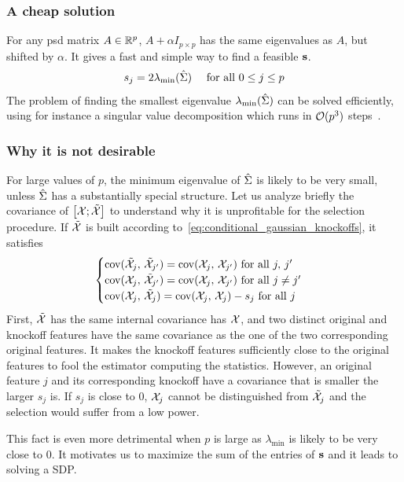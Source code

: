 \subsubsection{A cheap solution}

For any psd matrix $A \in \mathbb{R}^p$, $A + \alpha I_{p \times p}$ has the same eigenvalues as $A$, but shifted by $\alpha$.
It gives a fast and simple way to find a feasible $\mathbf{s}$.
\begin{equation}\label{eq:equi}
    s_j = 2\lambda_{\min}(\hat{\Sigma})
    \quad\text{ for all } 0 \leq j \leq p
\end{equation}
The problem of finding the smallest eigenvalue $\lambda_{\min}(\hat{\Sigma})$ can be solved efficiently,
using for instance a singular value decomposition which runs in $\mathcal{O}(p^3)$ steps~\cite{svd}.

\subsubsection{Why it is not desirable}

For large values of $p$,
the minimum eigenvalue of $\hat{\Sigma}$ is likely to be very small,
unless $\hat{\Sigma}$ has a substantially special structure.
Let us analyze briefly the covariance of $\big[ \mathcal{X}; \tilde{\mathcal{X}} \big]$
to understand why it is unprofitable for the selection procedure.
If $\tilde{\mathcal{X}}$ is built according to~\ref{eq:conditional_gaussian_knockoffs}, it satisfies
\begin{equation*}
    \begin{cases}
        \operatorname*{cov}(\tilde{\mathcal{X}}_j,\, \tilde{\mathcal{X}}_{j'}) = \operatorname*{cov}(\mathcal{X}_j,\, \mathcal{X}_{j'}) \text{ for all } j,\,j'\\
        \operatorname*{cov}(\mathcal{X}_j,\, \tilde{\mathcal{X}}_{j'}) = \operatorname*{cov}(\mathcal{X}_j,\, \mathcal{X}_{j'}) \text{ for all } j \neq j'\\
        \operatorname*{cov}(\mathcal{X}_j,\, \tilde{\mathcal{X}}_j) = \operatorname*{cov}(\mathcal{X}_j,\, \mathcal{X}_j) - s_j \text{ for all } j
    \end{cases}
\end{equation*}
First, $\tilde{\mathcal{X}}$ has the same internal covariance has $\mathcal{X}$,
and two distinct original and knockoff features have the same covariance
as the one of the two corresponding original features.
It makes the knockoff features sufficiently close to the original features
to fool the estimator computing the statistics.
However, an original feature $j$ and its corresponding knockoff have a covariance that is smaller the larger $s_j$ is.
If $s_j$ is close to $0$,
$\mathcal{X}_j$ cannot be distinguished from $\tilde{\mathcal{X}}_j$ and the selection would suffer from a low power.

This fact is even more detrimental when $p$ is large as $\lambda_{\min}$ is likely to be very close to $0$.
It motivates us to maximize the sum of the entries of $\mathbf{s}$ and it leads to solving a SDP\@.

